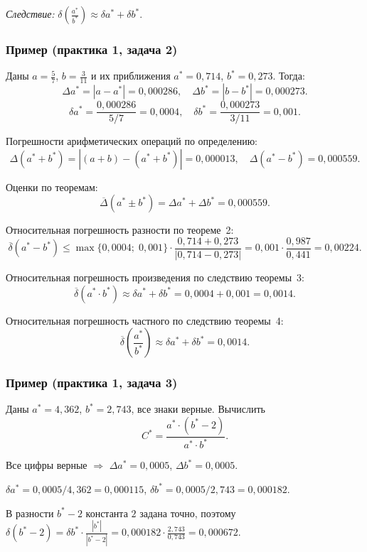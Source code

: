 \textit{Следствие:} $\displaystyle\delta\!\left(\frac{a^*}{b^*}\right) \approx \delta a^* + \delta b^*$.

\subsubsection*{Пример (практика 1, задача 2)}

Даны $a = \frac{5}{7}$, $b = \frac{3}{11}$ и их приближения $a^* = 0{,}714$, $b^* = 0{,}273$. Тогда:
\[
    \Delta a^* = |a - a^*| = 0{,}000286, \quad \Delta b^* = |b - b^*| = 0{,}000273.
\]
\[
    \delta a^* = \frac{0{,}000286}{5/7} = 0{,}0004, \quad \delta b^* = \frac{0{,}000273}{3/11} = 0{,}001.
\]

Погрешности арифметических операций по определению:
\[
    \Delta(a^* + b^*) = |(a+b) - (a^*+b^*)| = 0{,}000013, \quad
    \Delta(a^* - b^*) = 0{,}000559.
\]

Оценки по теоремам:
\[
    \overline{\Delta}(a^* \pm b^*) = \Delta a^* + \Delta b^* = 0{,}000559.
\]

Относительная погрешность разности по теореме~2:
\[
    \overline{\delta}(a^* - b^*) \leq \max\{0{,}0004;\; 0{,}001\} \cdot \frac{0{,}714 + 0{,}273}{|0{,}714 - 0{,}273|} = 0{,}001 \cdot \frac{0{,}987}{0{,}441} = 0{,}00224.
\]

Относительная погрешность произведения по следствию теоремы~3:
\[
    \overline{\delta}(a^* \cdot b^*) \approx \delta a^* + \delta b^* = 0{,}0004 + 0{,}001 = 0{,}0014.
\]

Относительная погрешность частного по следствию теоремы~4:
\[
    \overline{\delta}\!\left(\frac{a^*}{b^*}\right) \approx \delta a^* + \delta b^* = 0{,}0014.
\]

\subsubsection*{Пример (практика 1, задача 3)}

Даны $a^* = 4{,}362$, $b^* = 2{,}743$, все знаки верные. Вычислить
\[
    C^* = \frac{a^* \cdot (b^* - 2)}{a^* \cdot b^*}.
\]

Все цифры верные $\Rightarrow$ $\Delta a^* = 0{,}0005$, $\Delta b^* = 0{,}0005$.

$\delta a^* = 0{,}0005/4{,}362 = 0{,}000115$, $\delta b^* = 0{,}0005/2{,}743 = 0{,}000182$.

В разности $b^* - 2$ константа $2$ задана точно, поэтому $\delta(b^*-2) = \delta b^* \cdot \frac{|b^*|}{|b^*-2|} = 0{,}000182 \cdot \frac{2{,}743}{0{,}743} = 0{,}000672$.

